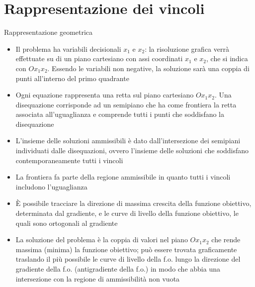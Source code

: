 \documentclass{beamer}
\begin{document}
\section{Rappresentazione dei vincoli}

\begin{frame}[allowframebreaks]{Rappresentazione geometrica}
\small{

\begin{itemize}
\item 
Il problema ha variabili decisionali $x_1$ e $x_2$:
la risoluzione grafica verr\`a effettuate su di un piano cartesiano con assi
coordinati $x_1$ e $x_2$, che si indica con $Ox_1x_2$.
Essendo le variabili non negative, la soluzione sar\`a una coppia di punti
all'interno del primo quadrante

\item 
Ogni equazione rappresenta una retta sul piano cartesiano $Ox_1x_2$.
Una disequazione corrisponde ad un semipiano che ha come frontiera la retta
associata all'uguaglianza e comprende tutti i punti che soddisfano la
disequazione

\item 
L'insieme delle soluzioni ammissibili \`e dato dall'intersezione dei semipiani
individuati dalle disequazioni, ovvero l'insieme delle soluzioni che soddisfano
contemporaneamente tutti i vincoli

\item 
La frontiera fa parte della regione ammissibile in quanto tutti i vincoli
includono l'uguaglianza

\item 
\`E possibile tracciare la direzione di massima crescita della funzione obiettivo,
determinata dal gradiente, e le curve di livello della funzione obiettivo, le quali
sono ortogonali al gradiente

\item 
La soluzione del problema \`e la coppia di valori nel piano $Ox_1x_2$ che rende
massima (minima) la funzione obiettivo; pu\`o essere trovata graficamente traslando
il pi\`u possibile le curve di livello della f.o. lungo la direzione del gradiente
della f.o. (antigradiente della f.o.) in modo che abbia una intersezione con la
regione di ammissibilit\`a non vuota
\end{itemize}
}
\end{frame}
\end{document}
